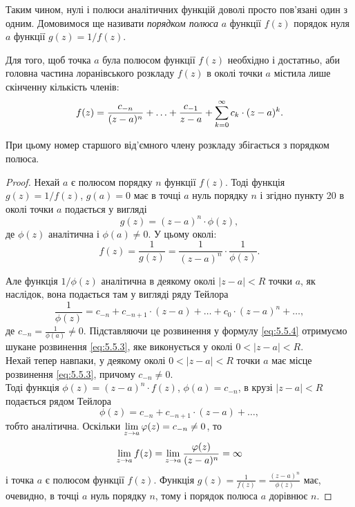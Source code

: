 Таким чином, нулі і полюси аналітичних функцій доволі просто пов'язані один з одним. Домовимося ще називати \textit{порядком полюса} $a$ функції $f(z)$ порядок нуля $a$ функції $g(z) = 1 / f(z)$.

\begin{theorem}
	Для того, щоб точка $a$ була полюсом функції $f(z)$ необхідно і достатньо, аби головна частина лоранівського розкладу $f(z)$ в околі точки $a$ містила лише скінченну кількість членів:
	\begin{equation}
		\label{eq:5.5.3}
		f(z) = \frac{c_{-n}}{(z - a)^n} + \ldots + \frac{c_{-1}}{z - a} + \displaystyle\sum\limits_{k = 0}^\infty c_k \cdot (z - a)^k.
	\end{equation}

	При цьому номер старшого від'ємного члену розкладу збігається з порядком полюса.
\end{theorem}

\begin{proof}
	Нехай $a$ є полюсом порядку $n$ функції $f(z)$. Тоді функція $g(z) = 1 / f(z)$, $g(a) = 0$ має в точці $a$ нуль порядку $n$ і згідно пункту 20 в околі точки $a$ подається у вигляді 
	\begin{equation*}
		g(z) = (z - a)^n \cdot \phi(z),
	\end{equation*}
	де $\phi(z)$ аналітична і $\phi(a) \ne 0$. У цьому околі:
	\begin{equation}
		\label{eq:5.5.4}
		f(z) = \frac{1}{g(z)} = \frac{1}{(z - a)^n} \cdot \frac{1}{\phi(z)}.
	\end{equation}

	Але функція $1 / \phi(z)$ аналітична в деякому околі $|z - a| < R$ точки $a$, як наслідок, вона подається там у вигляді ряду Тейлора
	\begin{equation*}
		\frac{1}{\phi(z)} = c_{-n} + c_{-n + 1} \cdot (z - a) + \ldots + c_0 \cdot (z - a)^n + \ldots,
	\end{equation*}
	де $c_{-n} = \frac{1}{\phi(a)} \ne 0$. Підставляючи це розвинення у формулу \eqref{eq:5.5.4} отримуємо шукане розвинення \eqref{eq:5.5.3}, яке виконується у околі $0 < |z - a| < R$. \\

	Нехай тепер навпаки, у деякому околі $0 < |z - a| < R$ точки $a$ має місце розвинення \eqref{eq:5.5.3}, причому $c_{-n} \ne 0$. \\

	Тоді функція $\phi(z) = (z - a)^n \cdot f(z)$, $\phi(a) = c_{-n}$, в крузі $|z - a| < R$ подається рядом Тейлора
	\begin{equation}
		\label{eq:5.5.5}
		\phi(z) = c_{-n} + c_{-n + 1} \cdot (z - a) + \ldots,
	\end{equation}
	тобто аналітична. Оскільки $\displaystyle\lim\limits_{z \to a} \varphi(z) = c_{-n} \ne 0$, то
	\begin{equation*}
		\displaystyle\lim\limits_{z \to a} f(z) = \displaystyle\lim\limits_{z \to a} \frac{\varphi(z)}{(z - a)^n} = \infty
	\end{equation*}
	і точка $a$ є полюсом функції $f(z)$. Функція $g(z) = \frac{1}{f(z)} = \frac{(z - a)^n}{\phi(z)}$ має, очевидно, в точці $a$ нуль порядку $n$, тому і порядок полюса $a$ дорівнює $n$.
\end{proof}

